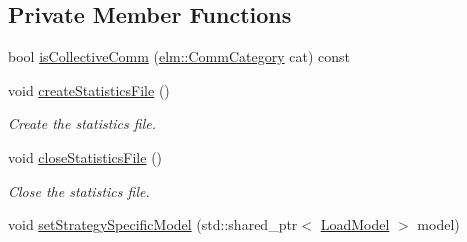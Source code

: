 \subsection*{Private Member Functions}
\begin{DoxyCompactItemize}
\item 
bool \hyperlink{structvt_1_1vrt_1_1collection_1_1balance_1_1_l_b_manager_acf0c8a9a18f038e2c5c5ae9c7e17615e}{is\+Collective\+Comm} (\hyperlink{namespacevt_1_1elm_ab7367fdbe88bdcf329563642147f9ae2}{elm\+::\+Comm\+Category} cat) const
\item 
void \hyperlink{structvt_1_1vrt_1_1collection_1_1balance_1_1_l_b_manager_af799741f6f75f520eb8b576ac2732683}{create\+Statistics\+File} ()
\begin{DoxyCompactList}\small\item\em Create the statistics file. \end{DoxyCompactList}\item 
void \hyperlink{structvt_1_1vrt_1_1collection_1_1balance_1_1_l_b_manager_a7fcd0cc4e6fa9a101411ece9bc687141}{close\+Statistics\+File} ()
\begin{DoxyCompactList}\small\item\em Close the statistics file. \end{DoxyCompactList}\item 
void \hyperlink{structvt_1_1vrt_1_1collection_1_1balance_1_1_l_b_manager_a61b3a80da3e42f1e542a391e50d41c82}{set\+Strategy\+Specific\+Model} (std\+::shared\+\_\+ptr$<$ \hyperlink{structvt_1_1vrt_1_1collection_1_1balance_1_1_load_model}{Load\+Model} $>$ model)
\end{DoxyCompactItemize}

